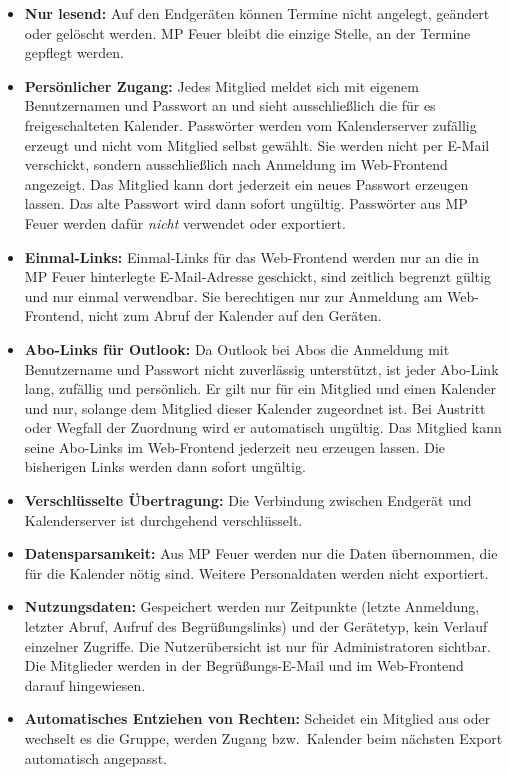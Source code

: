 \documentclass[a4paper,fontsize=10pt]{scrartcl}
\begin{document}
\begin{itemize}
  \item \textbf{Nur lesend:} Auf den Endgeräten können Termine nicht
        angelegt, geändert oder gelöscht werden. MP Feuer bleibt die einzige
        Stelle, an der Termine gepflegt werden.
  \item \textbf{Persönlicher Zugang:} Jedes Mitglied meldet sich mit eigenem
        Benutzernamen und Passwort an und sieht ausschließlich die für es
        freigeschalteten Kalender. Passwörter werden vom Kalenderserver
        zufällig erzeugt und nicht vom Mitglied selbst gewählt. Sie werden
        nicht per E-Mail verschickt, sondern ausschließlich nach Anmeldung im
        Web-Frontend angezeigt. Das Mitglied kann dort jederzeit ein neues
        Passwort erzeugen lassen. Das alte Passwort wird dann sofort
        ungültig. Passwörter aus MP Feuer werden dafür \emph{nicht}
        verwendet oder exportiert.
  \item \textbf{Einmal-Links:} Einmal-Links für das Web-Frontend werden nur
        an die in MP Feuer hinterlegte E-Mail-Adresse geschickt, sind
        zeitlich begrenzt gültig und nur einmal verwendbar. Sie berechtigen
        nur zur Anmeldung am Web-Frontend, nicht zum Abruf der Kalender auf
        den Geräten.
  \item \textbf{Abo-Links für Outlook:} Da Outlook bei Abos die Anmeldung mit
        Benutzername und Passwort nicht zuverlässig unterstützt, ist jeder Abo-Link lang,
        zufällig und persönlich. Er gilt nur für ein Mitglied und einen
        Kalender und nur, solange dem Mitglied dieser Kalender zugeordnet
        ist. Bei Austritt oder Wegfall der Zuordnung wird er automatisch
        ungültig. Das Mitglied kann seine Abo-Links im Web-Frontend jederzeit
        neu erzeugen lassen. Die bisherigen Links werden dann sofort
        ungültig.
  \item \textbf{Verschlüsselte Übertragung:} Die Verbindung zwischen
        Endgerät und Kalenderserver ist durchgehend verschlüsselt.
  \item \textbf{Datensparsamkeit:} Aus MP Feuer werden nur die Daten
        übernommen, die für die Kalender nötig sind. Weitere
        Personaldaten werden nicht exportiert.
  \item \textbf{Nutzungsdaten:} Gespeichert werden nur Zeitpunkte (letzte
        Anmeldung, letzter Abruf, Aufruf des Begrüßungslinks) und der
        Gerätetyp, kein Verlauf einzelner Zugriffe. Die Nutzerübersicht ist nur
        für Administratoren sichtbar. Die Mitglieder werden in der
        Begrüßungs-E-Mail und im Web-Frontend darauf hingewiesen.
  \item \textbf{Automatisches Entziehen von Rechten:} Scheidet ein Mitglied
        aus oder wechselt es die Gruppe, werden Zugang bzw.\ Kalender beim
        nächsten Export automatisch angepasst.
\end{itemize}
\end{document}
